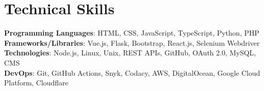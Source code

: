 \section{Technical Skills}
 \begin{itemize}[leftmargin=0.15in, label={}]
    \small{\item{
     \textbf{Programming Languages}{: HTML, CSS, JavaScript, TypeScript, Python, PHP} \\
     \textbf{Frameworks/Libraries}{: Vue.js, Flask, Bootstrap, React.js, Selenium Webdriver} \\
     \textbf{Technologies}{: Node.js, Linux, Unix, REST APIs, GitHub, OAuth 2.0, MySQL, CMS } \\
     \textbf{DevOps}{: Git, GitHub Actions, Snyk, Codacy, AWS, DigitalOcean, Google Cloud Platform, Cloudflare }
    }}
 \end{itemize}  